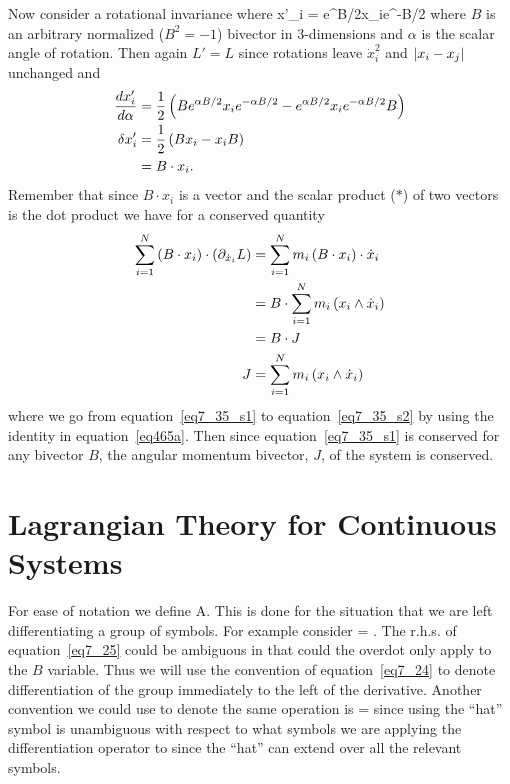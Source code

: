 Now consider a rotational invariance where
\be
    x'_{i} = e^{\alpha B/2}x_{i}e^{-\alpha B/2}
\ee
where $B$ is an arbitrary normalized ($B^{2}=-1$) bivector in 3-dimensions and $\alpha$ is the scalar 
angle of rotation.  Then again $L' = L$ since rotations leave $\dot{x}_{i}^{2}$ and $\left | {x_{i}-x_{j}} \right |$
unchanged and
\begin{align}
    \displaystyle\frac{d{x'_{i}}}{d{\alpha}} &= \displaystyle\frac{1}{2}\left ( {Be^{\alpha B/2}x_{i}e^{-\alpha B/2}-e^{\alpha B/2}x_{i}e^{-\alpha B/2}B} \right ) \nonumber \\
    \delta x'_{i} &= \displaystyle\frac{1}{2}\left ( {Bx_{i}-x_{i}B} \right ) \nonumber \\
                  &= B\cdot x_{i}.
\end{align}
Remember that since $B\cdot x_{i}$ is a vector and the scalar product ($*$) of two vectors is the dot product we have for a 
conserved quantity
\begin{align}
  \sum_{i=1}^{N}\left ( {B\cdot x_{i}} \right )\cdot\left ( {\partial_{\dot{x}_{i}}L} \right ) 
           &= \sum_{i=1}^{N}m_{i}\left ( {B\cdot x_{i}} \right )\cdot\dot{x}_{i} \label{eq7_35_s1}\\
           &= B\cdot \sum_{i=1}^{N}m_{i}\left ( {x_{i}\wedge\dot{x}_{i}} \right ) \label{eq7_35_s2} \\
           &= B\cdot J \\
        J  &= \sum_{i=1}^{N}m_{i}\left ( {x_{i}\wedge\dot{x}_{i}} \right )
\end{align}
where we go from equation~\ref{eq7_35_s1} to equation~\ref{eq7_35_s2} by using the identity in equation~\ref{eq465a}. Then since 
equation~\ref{eq7_35_s1} is conserved for any bivector $B$, the angular momentum bivector, $J$, of the system is conserved.
\section{Lagrangian Theory for Continuous Systems}
For ease of notation we define
\be
	A\lgrad \equiv {}\dot{\nabla}.\label{eq7_24}
\ee
This is done for the situation that we are left differentiating a group of symbols.  For example consider
\be
	\lgrad = \dot{\nabla}.\label{eq7_25}
\ee
The r.h.s. of equation~\ref{eq7_25} could be ambiguous in that could the overdot only apply to the $B$ variable.  Thus we will use the convention
of equation~\ref{eq7_24} to denote differentiation of the group immediately to the left of the derivative.  Another convention we could use to 
denote the same operation is
\be
	\widehat{\nabla} = \lgrad
\ee
since using the ``hat'' symbol is unambiguous with respect to what symbols we are applying the differentiation operator to since the ``hat'' can extend
over all the relevant symbols.  
